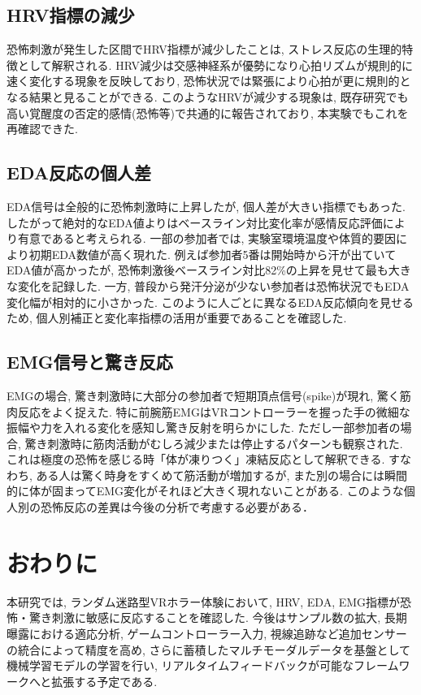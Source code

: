 \documentclass[a4paper]{jarticle}
\begin{document}
\subsection{HRV指標の減少}

恐怖刺激が発生した区間でHRV指標が減少したことは, ストレス反応の生理的特徴として解釈される. HRV減少は交感神経系が優勢になり心拍リズムが規則的に速く変化する現象を反映しており, 恐怖状況では緊張により心拍が更に規則的となる結果と見ることができる. このようなHRVが減少する現象は, 既存研究\cite{bib13}でも高い覚醒度の否定的感情(恐怖等)で共通的に報告されており, 本実験でもこれを再確認できた.

\subsection{EDA反応の個人差}

EDA信号は全般的に恐怖刺激時に上昇したが, 個人差が大きい指標でもあった. したがって絶対的なEDA値よりはベースライン対比変化率が感情反応評価により有意であると考えられる. 一部の参加者では, 実験室環境温度や体質的要因により初期EDA数値が高く現れた. 例えば参加者5番は開始時から汗が出ていてEDA値が高かったが, 恐怖刺激後ベースライン対比82\%の上昇を見せて最も大きな変化を記録した. 一方, 普段から発汗分泌が少ない参加者は恐怖状況でもEDA変化幅が相対的に小さかった. このように人ごとに異なるEDA反応傾向を見せるため, 個人別補正と変化率指標の活用が重要であることを確認した.

\subsection{EMG信号と驚き反応}

EMGの場合, 驚き刺激時に大部分の参加者で短期頂点信号(spike)が現れ, 驚く筋肉反応をよく捉えた. 特に前腕筋EMGはVRコントローラーを握った手の微細な振幅や力を入れる変化を感知し驚き反射を明らかにした. ただし一部参加者の場合, 驚き刺激時に筋肉活動がむしろ減少または停止するパターンも観察された. これは極度の恐怖を感じる時「体が凍りつく」凍結反応として解釈できる. すなわち, ある人は驚く時身をすくめて筋活動が増加するが, また別の場合には瞬間的に体が固まってEMG変化がそれほど大きく現れないことがある. このような個人別の恐怖反応の差異は今後の分析で考慮する必要がある．

\section{おわりに}%

本研究では, ランダム迷路型VRホラー体験において, HRV, EDA, EMG指標が恐怖・驚き刺激に敏感に反応することを確認した. 今後はサンプル数の拡大, 長期曝露における適応分析, ゲームコントローラー入力, 視線追跡など追加センサーの統合によって精度を高め, さらに蓄積したマルチモーダルデータを基盤として機械学習モデルの学習を行い, リアルタイムフィードバックが可能なフレームワークへと拡張する予定である.
\end{document}

